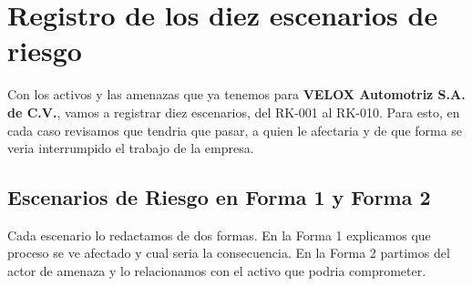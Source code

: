 \documentclass[letterpaper,11pt]{article}
\begin{document}
\section{Registro de los diez escenarios de riesgo}

Con los activos y las amenazas que ya tenemos para \textbf{VELOX
Automotriz S.A. de C.V.}, vamos a registrar diez escenarios, del
RK-001 al RK-010. Para esto, en cada caso revisamos que tendria que
pasar, a quien le afectaria y de que forma se veria interrumpido el
trabajo de la empresa.

\subsection{Escenarios de Riesgo en Forma 1 y Forma 2}

Cada escenario lo redactamos de dos formas. En la Forma 1 explicamos
que proceso se ve afectado y cual seria la consecuencia. En la Forma
2 partimos del actor de amenaza y lo relacionamos con el activo que
podria comprometer.
\end{document}
